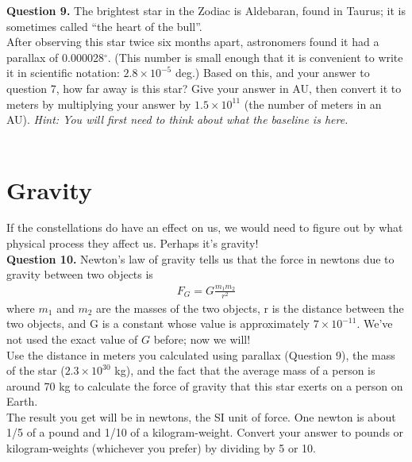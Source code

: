 \documentclass[11pt]{article}
\begin{document}
\textbf{Question 9.} The brightest star in the Zodiac is Aldebaran, found in Taurus; it is sometimes called ``the heart of the bull''.\\ 

After observing this star twice six months apart, astronomers found it had a parallax of 0.000028$^\circ$. (This number is small enough that it is convenient to write it in scientific notation: $2.8 \times 10^{-5}$ deg.) Based on this, and your answer to question 7, how far away is this star? Give your answer in AU, then convert it to meters by multiplying your answer by $1.5\times 10^{11}$ (the number of meters in an AU).
{\it Hint: You will first need to think about what the baseline is here.}\\

\vfill
\hrulefill\\

\section{Gravity}
If the constellations do have an effect on us, we would need to figure out by what physical process they affect us. Perhaps it's gravity!\\

\textbf{Question 10.} Newton's law of gravity tells us that the force in newtons due to gravity between two objects is
\begin{align*}
F_G=G\frac{m_1 m_2}{r^2}
\end{align*}
where $m_1$ and $m_2$ are the masses of the two objects, r is the distance between the two objects, and G is a constant whose value is approximately $7\times 10^{-11}$. We've not used the exact value of $G$ before; now we will!\\

Use the distance in meters you calculated using parallax (Question 9), the mass of the star ($2.3\times 10^{30}$ kg), and the fact that the average mass of a person is around 70 kg to calculate the force of gravity that this star exerts on a person on Earth.\\

The result you get will be in newtons, the SI unit of force. One newton is about 1/5 of a pound and 1/10 of a kilogram-weight. Convert your answer to pounds or kilogram-weights (whichever you prefer) by dividing by 5 or 10. 

\vspace{2.5cm}
\hrulefill\\
\vspace{2em}
\end{document}
